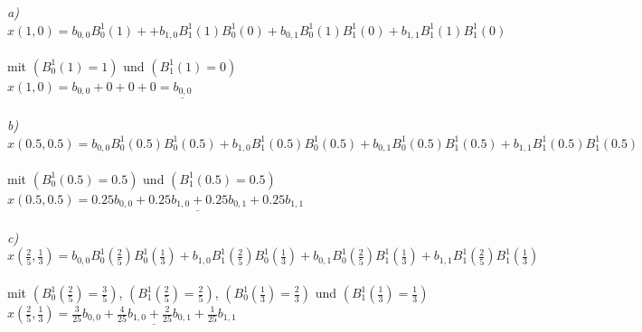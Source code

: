 \documentclass{article}
\begin{document}
\emph{a)}\\
$x(1,0) = b_{0,0} B_0^1(1) + + b_{1,0} B_1^1(1) B_0^1(0) + b_{0,1} B_0^1(1) B_1^1(0) + b_{1,1} B_1^1(1) B_1^1(0) $ \\
\\ mit $( B_0^1(1) = 1 )$ und $( B_1^1(1) = 0 )$ \\
$x(1,0) = b_{0,0} + 0 + 0 + 0 = \underline{b_{0,0}}$ \\
\\
\emph{b)}\\
$ x(0.5, 0.5) = b_{0,0} B_0^1(0.5) B_0^1(0.5) + b_{1,0} B_1^1(0.5) B_0^1(0.5) + b_{0,1} B_0^1(0.5) B_1^1(0.5) + b_{1,1} B_1^1(0.5) B_1^1(0.5) $ \\
\\ mit $( B_0^1(0.5) = 0.5 )$ und $( B_1^1(0.5) = 0.5 )$ \\
$ x(0.5, 0.5) = \underline{0.25 b_{0,0} + 0.25 b_{1,0} + 0.25 b_{0,1} + 0.25 b_{1,1}} $ \\
\\
\emph{c)}\\
$ x\left(\frac{2}{5}, \frac{1}{3}\right) = b_{0,0} B_0^1\left(\frac{2}{5}\right) B_0^1\left(\frac{1}{3}\right) + b_{1,0} B_1^1\left(\frac{2}{5}\right) B_0^1\left(\frac{1}{3}\right) + b_{0,1} B_0^1\left(\frac{2}{5}\right) B_1^1\left(\frac{1}{3}\right) + b_{1,1} B_1^1\left(\frac{2}{5}\right) B_1^1\left(\frac{1}{3}\right) $ \\
\\ mit $( B_0^1\left(\frac{2}{5}\right) = \frac{3}{5} )$, $( B_1^1\left(\frac{2}{5}\right) = \frac{2}{5} )$, $( B_0^1\left(\frac{1}{3}\right) = \frac{2}{3} )$ und $( B_1^1\left(\frac{1}{3}\right) = \frac{1}{3} )$ \\
$ x\left(\frac{2}{5}, \frac{1}{3}\right) = \underline{\frac{3}{25} b_{0,0} + \frac{4}{25} b_{1,0} + \frac{2}{25} b_{0,1} + \frac{1}{25} b_{1,1}} $\\
\\
\end{document}
